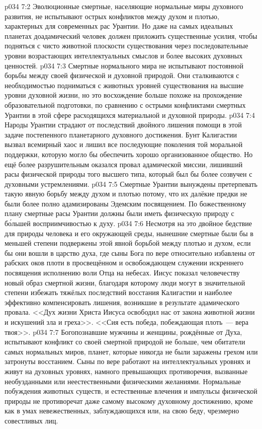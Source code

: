 \vs p034 7:2 Эволюционные смертные, населяющие нормальные миры духовного развития, не испытывают острых конфликтов между духом и плотью, характерных для современных рас Урантии. Но даже на самых идеальных планетах доадамический человек должен приложить существенные усилия, чтобы подняться с чисто животной плоскости существования через последовательные уровни возрастающих интеллектуальных смыслов и более высоких духовных ценностей.
\vs p034 7:3 Смертные нормального мира не испытывают постоянной борьбы между своей физической и духовной природой. Они сталкиваются с необходимостью подниматься с животных уровней существования на высшие уровни духовной жизни, но это восхождение больше похоже на прохождение образовательной подготовки, по сравнению с острыми конфликтами смертных Урантии в этой сфере расходящихся материальной и духовной природы.
\vs p034 7:4 \pc Народы Урантии страдают от последствий двойного лишения помощи в этой задаче постепенного планетарного духовного достижения. Бунт Калигастии вызвал всемирный хаос и лишил все последующие поколения той моральной поддержки, которую могло бы обеспечить хорошо организованное общество. Но ещё более разрушительным оказался провал адамической миссии, лишивший расы физической природы того высшего типа, который был бы более созвучен с духовными устремлениями.
\vs p034 7:5 Смертные Урантии вынуждены претерпевать такую явную борьбу между духом и плотью потому, что их далёкие предки не были более полно адамизированы Эдемским посвящением. По божественному плану смертные расы Урантии должны были иметь физическую природу с б\'ольшей восприимчивостью к духу.
\vs p034 7:6 \pc Несмотря на это двойное бедствие для природы человека и его окружающей среды, нынешние смертные были бы в меньшей степени подвержены этой явной борьбой между плотью и духом, если бы они вошли в царство духа, где сыны Бога по вере относительно избавлены от рабских оков плоти в просвещённом и освобождающем служении искреннего посвящения исполнению воли Отца на небесах. Иисус показал человечеству новый образ смертной жизни, благодаря которому люди могут в значительной степени избежать тяжёлых последствий восстания Калигастии и наиболее эффективно компенсировать лишения, возникшие в результате адамического провала. <<Дух жизни Христа Иисуса освободил нас от закона животной жизни и искушений зла и греха>>. <<Сия есть победа, побеждающая плоть~--- вера твоя>>.
\vs p034 7:7 Богопознавшие мужчины и женщины, рождённые от Духа, испытывают конфликт со своей смертной природой не больше, чем обитатели самых нормальных миров, планет, которые никогда не были заражены грехом или затронуты восстанием. Сыны по вере работают на интеллектуальных уровнях и живут на духовных уровнях, намного превышающих противоречия, вызванные необузданными или неестественными физическими желаниями. Нормальные побуждения животных существ, и естественные влечения и импульсы физической природы не противоречат даже самому высокому духовному достижению, кроме как в умах невежественных, заблуждающихся или, на свою беду, чрезмерно совестливых лиц.
